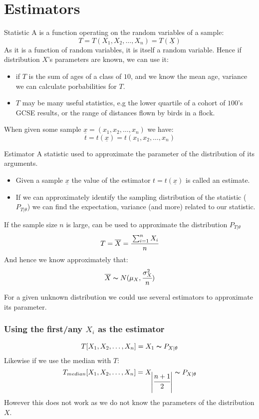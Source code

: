 \section{Estimators}
\begin{definitionbox}{Statistic}
	A  is a function operating on the random variables of a sample:
	\[T = T(X_1, X_2, \dots, X_n) = T(\underline{X})\]
	As it is a function of random variables, it is itself a random variable. Hence if distribution $X$'s parameters are known, we can use it:
	\begin{itemize}
		\item if $T$ is the sum of ages of a class of $10$, and we know the mean age, variance we can calculate porbabilities for $T$.
		\item $T$ may be many useful statistics, e.g the lower quartile of a cohort of $100$'s GCSE results, or the range of distances flown by birds in a flock.
	\end{itemize}
	When given some sample $\underline{x} = (x_1, x_2, \dots, x_n)$ we have:
	\[t = t(\underline{x}) = t(x_1, x_2, \dots, x_n)\]
\end{definitionbox}
\begin{definitionbox}{Estimator}
	A statistic used to approximate the parameter of the distribution of its arguments.
	\begin{itemize}
		\item Given a sample $\underline{x}$ the value of the estimator $t = t(\underline{x})$ is called an estimate.
		\item If we can approximately identify the sampling distribution of the statistic ($P_{T | \theta}$) we can find the expectation, variance (and more) related to our statistic.
	\end{itemize}
	If the sample size $n$ is large,  can be used to approximate the distribution $P_{T|\theta}$
	\[T = \overline{X} = \cfrac{\sum_{i=1}^{n}X_i}{n}\]
	And hence we know approximately that:
	\[\overline{X} \thicksim N(\mu_X, \cfrac{\sigma_X^2}{n})\]
\end{definitionbox}

For a given unknown distribution we could use several estimators to approximate its parameter.
\subsubsection*{Using the first/any $X_i$ as the estimator}
\[T[X_1, X_2, \dots , X_n] = X_1 \thicksim P_{X | \theta}\]
Likewise if we use the median with $T$:
\[T_{median} [X_1, X_2, \dots, X_n] = X_{\left| \cfrac{n+1}{2} \right|} \thicksim P_{X | \theta} \]
However this does not work as we do not know the parameters of the distribution $X$.
